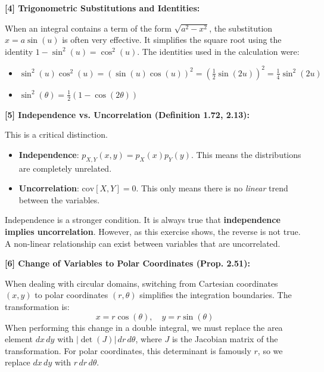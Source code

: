 \documentclass[11pt,a4paper]{article}
\theoremstyle{mystyle}
\begin{document}
\hypertarget{note4}{\textbf{[4] Trigonometric Substitutions and Identities:}}
When an integral contains a term of the form $\sqrt{a^2-x^2}$, the substitution $x=a\sin(u)$ is often very effective. It simplifies the square root using the identity $1-\sin^2(u) = \cos^2(u)$. The identities used in the calculation were:
\begin{itemize}
    \item $\sin^2(u)\cos^2(u) = (\sin(u)\cos(u))^2 = (\frac{1}{2}\sin(2u))^2 = \frac{1}{4}\sin^2(2u)$
    \item $\sin^2(\theta) = \frac{1}{2}(1 - \cos(2\theta))$
\end{itemize}

\hypertarget{note5}{\textbf{[5] Independence vs. Uncorrelation (Definition 1.72, 2.13):}}
This is a critical distinction.
\begin{itemize}
    \item \textbf{Independence}: $p_{X,Y}(x,y) = p_X(x)p_Y(y)$. This means the distributions are completely unrelated.
    \item \textbf{Uncorrelation}: $\text{cov}[X,Y] = 0$. This only means there is no \textit{linear} trend between the variables.
\end{itemize}
Independence is a stronger condition. It is always true that \textbf{independence implies uncorrelation}. However, as this exercise shows, the reverse is not true. A non-linear relationship can exist between variables that are uncorrelated.

\hypertarget{note6}{\textbf{[6] Change of Variables to Polar Coordinates (Prop. 2.51):}}
When dealing with circular domains, switching from Cartesian coordinates $(x,y)$ to polar coordinates $(r,\theta)$ simplifies the integration boundaries. The transformation is:
\[
x = r \cos(\theta), \quad y = r \sin(\theta)
\]
When performing this change in a double integral, we must replace the area element $dx\,dy$ with $| \det(J) | \,dr\,d\theta$, where $J$ is the Jacobian matrix of the transformation. For polar coordinates, this determinant is famously $r$, so we replace $dx\,dy$ with $r\,dr\,d\theta$.
\end{document}
